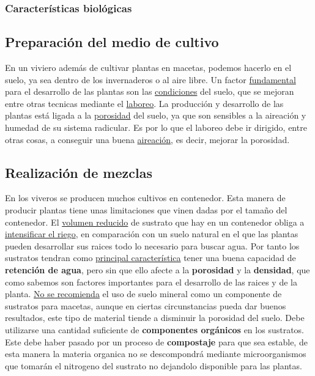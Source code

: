 \documentclass[a4paper,12pt,oneside]{article}
\begin{document}
\subsubsection{Características biológicas}
\label{sec:org262d8cd}
\subsection{Preparación del medio de cultivo}
\label{sec:orgc7eae7b}
En un viviero además de cultivar plantas en macetas, podemos hacerlo en el
suelo, ya sea dentro de los invernaderos o al aire libre. Un factor \uline{fundamental}
para el desarrollo de las plantas son las \uline{condiciones} del suelo, que se mejoran
entre otras tecnicas mediante el \uline{laboreo}.
La producción y desarrollo de las plantas está ligada a la \uline{porosidad} del
suelo, ya que son sensibles a la aireación y humedad de su sistema radicular. Es
por lo que el laboreo debe ir dirigido, entre otras cosas, a conseguir una buena
\uline{aireación}, es decir, mejorar la porosidad.
\subsection{Realización de mezclas}
\label{sec:org41be66e}
En los viveros se producen muchos cultivos en contenedor. Esta manera de
producir plantas tiene unas limitaciones que vinen dadas por el tamaño del
contenedor. El \uline{volumen reducido} de sustrato que hay en un contenedor obliga a
\uline{intensificar el riego}, en comparación con un suelo natural en el que las
plantas pueden desarrollar sus raices todo lo necesario para buscar agua. Por
tanto los sustratos tendran como \uline{principal característica} tener una buena
capacidad de \textbf{retención de agua}, pero sin que ello afecte a la \textbf{porosidad} y la
\textbf{densidad}, que como sabemos son factores importantes para el desarrollo de las
raices y de la planta.
\uline{No se recomienda} el uso de suelo mineral como un componente de sustratos para
macetas, aunque en ciertas circunstancias pueda dar buenos resultados, este tipo
de material tiende a disminuir la porosidad del suelo.
Debe utilizarse una cantidad suficiente de \textbf{componentes orgánicos} en los
sustratos. Este debe haber pasado por un proceso de \textbf{compostaje} para que sea
estable, de esta manera la materia organica no se descompondrá mediante
microorganismos que tomarán el nitrogeno del sustrato no dejandolo disponible
para las plantas.
\end{document}
